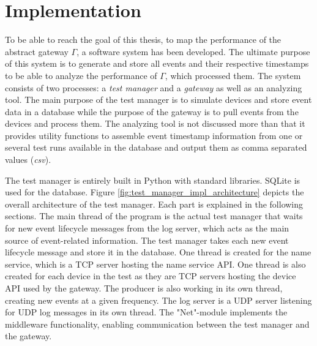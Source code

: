 \chapter{Implementation}
\label{ch:implementation}

To be able to reach the goal of this thesis, to map the performance of the
abstract gateway $\Gamma$, a software system has been developed. The ultimate
purpose of this system is to generate and store all events and their respective
timestamps to be able to analyze the performance of $\Gamma$, which processed
them. The system consists of two processes: a \textit{test manager} and a
\textit{gateway} as well as an analyzing tool. The main purpose of the test
manager is to simulate devices and store event data in a database while the
purpose of the gateway is to pull events from the devices and process them. The
analyzing tool is not discussed more than that it provides utility functions to
assemble event timestamp information from one or several test runs available in
the database and output them as comma separated values (\textit{csv}).

The test manager is entirely built in Python with standard libraries. SQLite is
used for the database. Figure \ref{fig:test_manager_impl_architecture} depicts
the overall architecture of the test manager. Each part is explained in the
following sections. The main thread of the program is the actual test manager
that waits for new event lifecycle messages from the log server, which acts as
the main source of event-related information. The test manager takes each new
event lifecycle message and store it in the database. One thread is created for
the name service, which is a TCP server hosting the name service API. One
thread is also created for each device in the test as they are TCP servers
hosting the device API used by the gateway. The producer is also working in its
own thread, creating new events at a given frequency. The log server is a UDP
server listening for UDP log messages in its own thread. The "Net"-module
implements the middleware functionality, enabling communication between the
test manager and the gateway.

